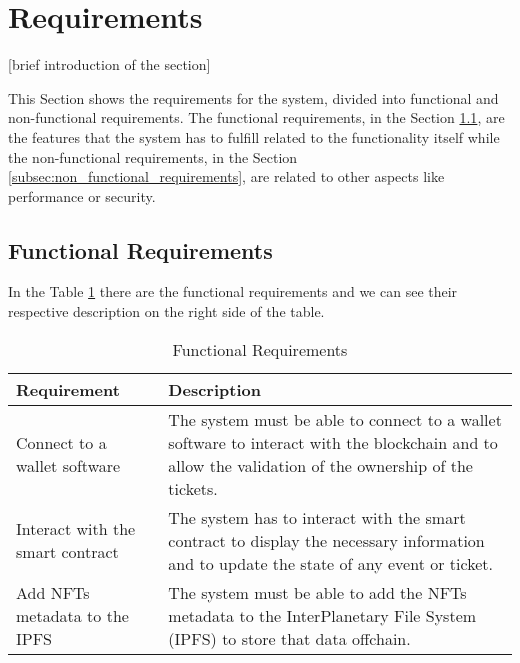 \section{Requirements}
\label{sec:requirements}

[brief introduction of the section]

This Section shows the requirements for the system, divided into functional and
non-functional requirements. The functional requirements, in the Section
\ref{subsec:functional_requirements}, are the features that the system has to
fulfill related to the functionality itself while the non-functional
requirements, in the Section \ref{subsec:non_functional_requirements}, are
related to other aspects like performance or security.

\subsection{Functional Requirements}
\label{subsec:functional_requirements}

In the Table \ref{tab:functional_requirements} there are the functional
requirements and we can see their respective description on the right side of
the table.

\begin{table}[H]
    \begin{tabularx}{\textwidth}{lX}
        \hline
        \textbf{Requirement}             & \textbf{Description}                                                                                                                                                                                                                                               \\
        \hline
        Connect to a wallet software     & The system must be able to connect                                                                                                      \newline to a wallet software to interact with the blockchain and to allow the validation of the ownership of the tickets. \\
        \hline
        Interact with the smart contract & The system has to interact with the smart contract to display the necessary information and to update the state of any event or ticket.                                                                                                                            \\
        \hline
        Add NFTs metadata to the IPFS    & The system must be able to add the NFTs metadata to the InterPlanetary File System (IPFS) to store that data offchain.                                                                                                                                             \\
        \hline
    \end{tabularx}
    \caption{Functional Requirements}
    \label{tab:functional_requirements}
\end{table}

